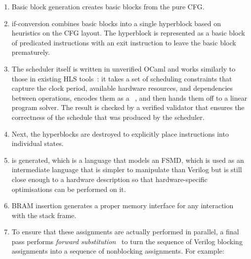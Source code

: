 \begin{enumerate}[label=\protect\blacknum{\arabic*}]
\item Basic block generation creates basic blocks from the pure \rtl{}
  \gls{CFG}.
\item \Gls{if-conversion} combines basic blocks into a single hyperblock based on
  heuristics on the \gls{CFG} layout.  The hyperblock is represented as a basic
  block of predicated instructions with an exit instruction to leave the basic
  block prematurely.
\item The scheduler itself is written in unverified OCaml and works similarly
  to those in existing HLS tools~\cite[]{canis13_l}: it takes a set of
  scheduling constraints that capture the clock period, available hardware
  resources, and dependencies between operations, encodes them as a
  ~\cite[]{cong06_sdc}, and then hands them off to a linear
  program solver.  The result is checked by a verified validator that ensures the correctness of the schedule that was produced by the scheduler.
\item Next, the hyperblocks are destroyed to explicitly place instructions into
  individual states.
\item \htl{} is generated, which is a language that models an \gls{FSMD}, which
  is used as an intermediate language that is simpler to manipulate than Verilog
  but is still close enough to a hardware description so that hardware-specific
  optimisations can be performed on it.
\item \gls{BRAM} insertion generates a proper memory interface for any
  interaction with the stack frame.
\item To ensure that these assignments are actually performed in parallel, a
  final pass performs \emph{forward substitution}~\cite[p.~109]{hopwood78_decom}
  to turn the sequence of Verilog blocking assignments into a sequence of
  nonblocking assignments. For example:
%
\begin{center}
\end{center}
\end{enumerate}
